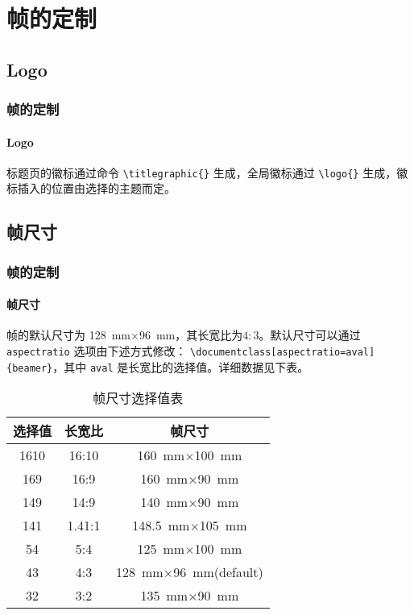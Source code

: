 \documentclass{beamer}
\begin{document}
\section{帧的定制}
\subsection{Logo}
\begin{frame}[containsverbatim]
\frametitle{帧的定制}
\framesubtitle{Logo}
标题页的徽标通过命令 \verb|\titlegraphic{}| 生成，全局徽标通过 \verb|\logo{}| 生成，徽标插入的位置由选择的主题而定。
\end{frame}

\subsection{帧尺寸}
\begin{frame}[containsverbatim]
\frametitle{帧的定制}
\framesubtitle{帧尺寸}
帧的默认尺寸为 \SI{128}{\milli\metre}$\times$\SI{96}{\milli\metre}，其长宽比为$4:3$。默认尺寸可以通过 \verb|aspectratio| 选项由下述方式修改： \verb|\documentclass[aspectratio=aval]{beamer}|，其中 \verb|aval| 是长宽比的选择值。详细数据见下表。
\end{frame}
\begin{frame}
\begin{table}
\begin{tabular}{ccc}
\toprule
选择值 & 长宽比 & 帧尺寸\\
\midrule
1610   & 16:10  & \SI{160}{\milli\metre}$\times$\SI{100}{\milli\metre}\\
\midrule
169    & 16:9   & \SI{160}{\milli\metre}$\times$\SI{90}{\milli\metre}\\
\midrule
149    & 14:9   & \SI{140}{\milli\metre}$\times$\SI{90}{\milli\metre}\\
\midrule
141    & 1.41:1 & \SI{148.5}{\milli\metre}$\times$\SI{105}{\milli\metre}\\
\midrule
54     & 5:4    & \SI{125}{\milli\metre}$\times$\SI{100}{\milli\metre}\\
\midrule
43     & 4:3    & \SI{128}{\milli\metre}$\times$\SI{96}{\milli\metre}(default)\\
\midrule
32     & 3:2    & \SI{135}{\milli\metre}$\times$\SI{90}{\milli\metre}\\
\bottomrule
\end{tabular}
\caption{帧尺寸选择值表}
\end{table}
\end{frame}
\end{document}
